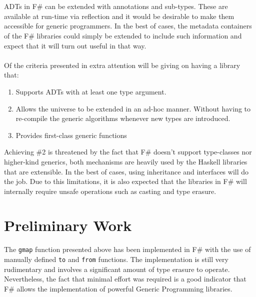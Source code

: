 \documentclass[8pt]{extarticle}
\begin{document}
\\\\
ADTs in F\# can be extended with annotations and sub-types. These are available at run-time via reflection and it would be desirable to make them accessible for generic programmers. In the best of cases, the metadata containers of the F\# libraries could simply be extended to include such information and expect that it will turn out useful in that way.
\\\\
Of the criteria presented in \cite{CompGen} extra attention will be giving on having a library that:
\begin{enumerate}
\item Supports ADTs with at least one type argument.
\item Allows the universe to be extended in an ad-hoc manner. Without having to re-compile the generic algorithms whenever new types are introduced.
\item Provides first-class generic functions
\end{enumerate}
Achieving \#2 is threatened by the fact that F\# doesn't support type-classes nor higher-kind generics, both mechanisms are heavily used by the Haskell libraries that are extensible. In the best of cases, using inheritance and interfaces will do the job. Due to this limitations, it is also expected that the libraries in F\# will internally require unsafe operations such as casting and type erasure.
\section{Preliminary Work}
The \verb+gmap+ function presented above has been implemented in F\#\cite{RegularFSharp} with the use of manually defined \verb+to+ and \verb+from+ functions. The implementation is still very rudimentary and involves a significant amount of type erasure to operate. Nevertheless, the fact that minimal effort was required is a good indicator that F\# allows the implementation of powerful Generic Programming libraries.
\end{document}
